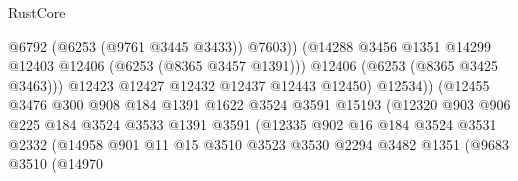 \begin{lexlean}{RustCore}
\begin{coremodule}
                                            @6792
                                            (@6253 (@9761 @3445 @3433))
                                            @7603))
                                        (@14288
                                          @3456
                                          @1351
                                          @14299
                                          @12403
                                          @12406
                                          (@6253 (@8365 @3457 @1391)))
                                        @12406
                                        (@6253 (@8365 @3425 @3463)))
                                      @12423
                                      @12427
                                      @12432
                                      @12437
                                      @12443
                                      @12450)
                                    @12534))
                                (@12455
                                  @3476
                                  @300
                                  @908
                                  @184
                                  @1391
                                  @1622
                                  @3524
                                  @3591
                                  @15193
                                  (@12320
                                    @903
                                    @906
                                    @225
                                    @184
                                    @3524
                                    @3533
                                    @1391
                                    @3591
                                    (@12335
                                      @902
                                      @16
                                      @184
                                      @3524
                                      @3531
                                      @2332
                                      (@14958
                                        @901
                                        @11
                                        @15
                                        @3510
                                        @3523
                                        @3530
                                        @2294
                                        @3482
                                        @1351
                                        (@9683
                                          @3510
                                          (@14970

\end{coremodule}
\end{lexlean}
